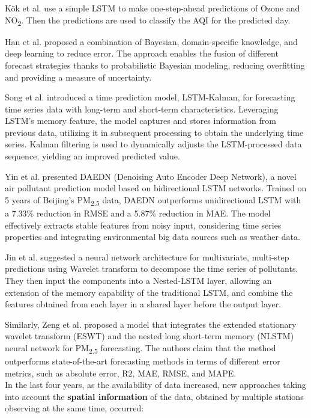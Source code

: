 \noindent K\"{o}k et al. \cite{8258144} use a simple LSTM to make one-step-ahead predictions of Ozone and NO\textsubscript{2}. Then the predictions are used to classify the AQI for the predicted day.

\noindent Han et al. \cite{9127775} proposed a combination of Bayesian, domain-specific knowledge, and deep learning to reduce error. The approach enables the fusion of different forecast strategies thanks to probabilistic Bayesian modeling, reducing overfitting and providing a measure of uncertainty.

\noindent Song et al. \cite{lstmkalman} introduced a time prediction model, LSTM-Kalman, for forecasting time series data with long-term and short-term characteristics. Leveraging LSTM's memory feature, the model captures and stores information from previous data, utilizing it in subsequent processing to obtain the underlying time series. Kalman filtering is used to dynamically adjusts the LSTM-processed data sequence, yielding an improved predicted value.

\noindent Yin et al. \cite{Yin2020} presented DAEDN (Denoising Auto Encoder Deep Network), a novel air pollutant prediction model based on bidirectional LSTM networks. Trained on 5 years of Beijing's PM\textsubscript{2.5} data, DAEDN outperforms unidirectional LSTM with a 7.33\% reduction in RMSE and a 5.87\% reduction in MAE. The model effectively extracts stable features from noisy input, considering time series properties and integrating environmental big data sources such as weather data.

\noindent Jin et al. \cite{WaveletNLSTM} suggested a neural network architecture for multivariate, multi-step predictions using Wavelet transform to decompose the time series of pollutants. They then input the components into a Nested-LSTM layer, allowing an extension of the memory capability of the traditional LSTM, and combine the features obtained from each layer in a shared layer before the output layer.

\noindent Similarly, Zeng et al. \cite{ZENG2022108822} proposed a model that integrates the extended stationary wavelet transform (ESWT) and the nested long short-term memory (NLSTM) neural network for PM\textsubscript{2.5} forecasting. The authors claim that the method outperforms state-of-the-art forecasting methods in terms of different error metrics, such as absolute error, R2, MAE, RMSE, and MAPE.\\


In the last four years, as the availability of data increased, new approaches taking into account the \textbf{spatial information} of the data, obtained by multiple stations observing at the same time, occurred:

